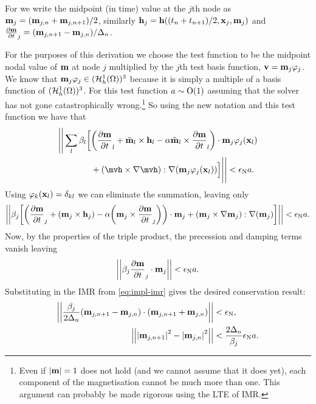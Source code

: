 {For  we write the midpoint (in time) value at the $j$th node as $\boldsymbol{\mathrm{m}}_j = (\boldsymbol{\mathrm{m}}_{j,n} + \boldsymbol{\mathrm{m}}_{j,n+1})/2$,  similarly $\boldsymbol{\mathrm{h}}_j = \boldsymbol{\mathrm{h}}((t_n+t_{n+1})/2, \boldsymbol{\mathrm{x}}_j, \boldsymbol{\mathrm{m}}_j)$ and $\frac{\partial \boldsymbol{\mathrm{m}}}{\partial t}_j = (\boldsymbol{\mathrm{m}}_{j,n+1} - \boldsymbol{\mathrm{m}}_{j,n})/\Delta_{n}$.

For the purposes of this derivation we choose the test function to be the midpoint nodal value of $\boldsymbol{\mathrm{m}}$ at node $j$ multiplied by the $j$th test basis function, \ie $\boldsymbol{\mathrm{v}} = \boldsymbol{\mathrm{m}}_{j} \varphi_j$.
We know that $\boldsymbol{\mathrm{m}}_{j}\varphi_j \in  ({\mathcal{H}^1_h(\Omega)})^3$ because it is simply a multiple of a basis function of $({\mathcal{H}^1_h(\Omega)})^3$.
For this test function $a \sim \mathrm{O}{\left( 1 \right)}$ assuming that the solver has not gone catastrophically wrong.\footnote{Even if $\left|{\boldsymbol{\mathrm{m}}} \right|=1$ does not hold (and we cannot assume that it does yet), each component of the magnetisation cannot be much more than one. This argument can probably be made rigorous using the LTE of IMR.}
So using the new notation and this test function we have that
\begin{equation}
  \begin{aligned}
    \Bigg|\Bigg| \sum_l \beta_l \bigg[& \bigb{\dmdt_l + \mvdis_l \times \hv_l - \dampc \mvdis_l \times \dmdt_l} \cdot \mv_{j}\tbf_j(\xv_l) \\
    &+ \bigb{\mvh \times \grad \mvh} : \grad (\mv_{j}\tbf_j(\xv_l)) \Big] \Bigg|\Bigg| < \ntol \sumbasiscoeff.
  \end{aligned}
\end{equation}
Using $\varphi_k(\boldsymbol{\mathrm{x}}_l) = \delta_{kl}$ we can eliminate the summation, leaving only
\begin{equation}
  \begin{aligned}
    \left| \left| \beta_j \bigg[ {\left( \frac{\partial \boldsymbol{\mathrm{m}}}{\partial t}_j  + (\boldsymbol{\mathrm{m}}_{j} \times \boldsymbol{\mathrm{h}}_{j})  - \alpha {\left( \boldsymbol{\mathrm{m}}_{j} \times \frac{\partial \boldsymbol{\mathrm{m}}}{\partial t}_j \right)} \right)} \cdot \boldsymbol{\mathrm{m}}_{j}
    + {\left( \boldsymbol{\mathrm{m}}_j \times \nabla \boldsymbol{\mathrm{m}}_j \right)} : \nabla (\boldsymbol{\mathrm{m}}_{j})
    \bigg]  \right| \right| < \epsilon_{\mathrm{N}} a.
  \end{aligned}
\end{equation}
Now, by the properties of the triple product, the precession and damping terms vanish leaving
\begin{equation}
  \left| \left| \beta_j \frac{\partial \boldsymbol{\mathrm{m}}}{\partial t}_j \cdot  \boldsymbol{\mathrm{m}}_{j}  \right| \right| < \epsilon_{\mathrm{N}} a.
\end{equation}
Substituting in the IMR from \cref{eq:impl-imr} gives the desired conservation result:
\begin{equation}
  \begin{aligned}
    \left| \left| \frac{\beta_j}{2\Delta_{n}}(\boldsymbol{\mathrm{m}}_{j,n+1} - \boldsymbol{\mathrm{m}}_{j,n}) \cdot (\boldsymbol{\mathrm{m}}_{j, n+1} + \boldsymbol{\mathrm{m}}_{j, n}) \right| \right| &< \epsilon_{\mathrm{N}}, \\
    \left| \left| \left|{\boldsymbol{\mathrm{m}}_{j, n+1}} \right|^2 - \left|{\boldsymbol{\mathrm{m}}_{j, n}} \right|^2 \right| \right| &< \frac{2\Delta_{n}}{\beta_j} \epsilon_{\mathrm{N}} a.
  \end{aligned}
\end{equation}

}
